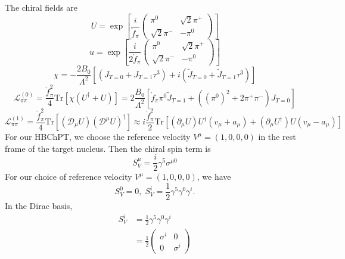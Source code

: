 \documentclass{book}[12pt]
\begin{document}
The chiral fields are
\begin{equation}
U=\exp\left[\frac{i}{\mathring{f}_{\pi}}\left(\begin{array}{cc}
\pi^0 & \sqrt{2} \pi^+\\
\sqrt{2}\pi^- & -\pi^0
\end{array}\right)\right]
\end{equation}
\begin{equation}
u=\exp\left[\frac{i}{2\mathring{f}_{\pi}}\left(\begin{array}{cc}
\pi^0 & \sqrt{2} \pi^+\\
\sqrt{2}\pi^- & -\pi^0
\end{array}\right)\right]
\end{equation}
\begin{equation}
\chi=-\frac{2B_0}{\Lambda^2}\left[\left(J_{T=0}+J_{T=1}\tau^3\right)+i\left(\tilde{J}_{T=0}+\tilde{J}_{T=1}\tau^3\right)\right]
\end{equation}
\begin{equation}
\mathcal{L}^{(0)}_{\pi\pi}=\frac{\mathring{f}_{\pi}^2}{4}\mathrm{Tr}\left[\chi\left(U^{\dag}+U\right)\right]=2\frac{B_0}{\Lambda^2}\left[\mathring{f}_{\pi}\pi^0 \tilde{J}_{T=1}+\left((\pi^0)^2+2\pi^+\pi^-\right)J_{T=0}\right]
\end{equation}
\begin{equation}
\mathcal{L}^{(1)}_{\pi\pi}=\frac{\mathring{f}_{\pi}^2}{4}\mathrm{Tr}\left[\left(\mathcal{D}_{\mu}U\right)\left(\mathcal{D}^{\mu}U\right)^{\dag}\right]\approx i\frac{\mathring{f}_{\pi}^2}{2}\mathrm{Tr}\left[\left(\partial_{\mu}U\right) U^{\dag}\left(v_{\mu}+a_{\mu}\right)+\left(\partial_{\mu}U^{\dag}\right)U\left(v_{\mu}-a_{\mu}\right)\right]
\end{equation}
For our HBChPT, we choose the reference velocity $V^{\mu}=(1,0,0,0)$ in the rest frame of the target nucleus. Then the chiral spin term is
\begin{equation}
S^{\mu}_V=\frac{i}{2}\gamma^5\sigma^{\mu 0}
\end{equation} 
For our choice of reference velocity $V^{\mu}=(1,0,0,0)$, we have
\begin{equation}
S_V^{0}=0,\;S_V^i=\frac{1}{2}\gamma^5\gamma^0\gamma^i.
\end{equation}
In the Dirac basis, 
\begin{equation}
\begin{split}
S_V^i&=\frac{1}{2}\gamma^5\gamma^0\gamma^i\\
&=\frac{1}{2}\left(\begin{array}{cc}
\sigma^i & 0\\
0 & \sigma^i
\end{array}\right)
\end{split}
\end{equation}
\end{document}
